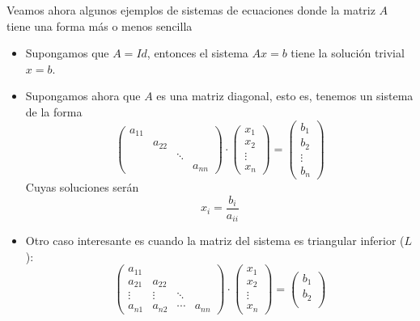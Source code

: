         \begin{ejes}
        Veamos ahora algunos ejemplos de sistemas de ecuaciones donde la matriz $A$ tiene una forma más o menos sencilla
        \begin{itemize}
            \item Supongamos que $A=Id$, entonces el sistema $Ax=b$ tiene la solución trivial $x=b$.
            \item Supongamos ahora que $A$ es una matriz diagonal, esto es, tenemos un sistema de la forma
              $$\begin{pmatrix}
            a_{11} & \\
            &a_{22}& \\
            & & \ddots &\\
             && &a_{nn}
            \end{pmatrix}\cdot \begin{pmatrix}
            x_1\\
            x_2\\
            \vdots\\
            x_n
            \end{pmatrix}=\begin{pmatrix}
            b_1\\
            b_2\\
            \vdots\\
            b_n
            \end{pmatrix}$$
            Cuyas soluciones serán 
            $$x_i=\dfrac{b_i}{a_{ii}}$$
            \item Otro caso interesante es cuando la matriz del sistema es triangular inferior ($L$):
            $$\begin{pmatrix}
            a_{11} & \\
            a_{21}&a_{22}& \\
            \vdots&\vdots& \ddots &\\
             a_{n1}&a_{n2}&\cdots &a_{nn}
            \end{pmatrix}\cdot \begin{pmatrix}
            x_1\\
            x_2\\
            \vdots\\
            x_n
            \end{pmatrix}=\begin{pmatrix}
            b_1\\
            b_2\\

\end{pmatrix}$$
\end{itemize}
\end{ejes}
